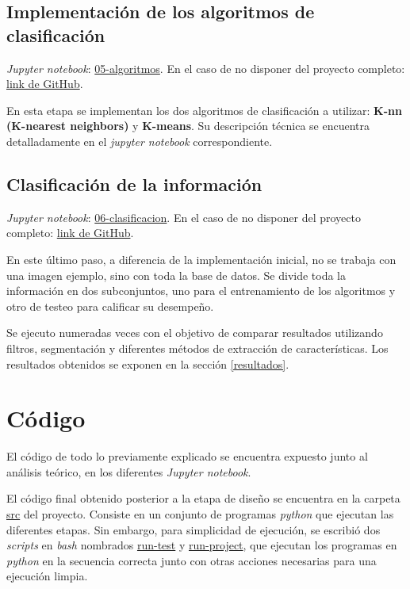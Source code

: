 \documentclass[10pt,a4paper]{article}
\begin{document}
\subsection{Implementación de los algoritmos de clasificación}
\textit{Jupyter notebook}: \href{./05-algoritmos.ipynb}{05-algoritmos}. En el caso de no disponer del proyecto completo: \href{https://github.com/FernandezGFG/fruit-classifier/blob/master/05-algoritmos.ipynb}{link de GitHub}.

En esta etapa se implementan los dos algoritmos de clasificación a utilizar: \textbf{K-nn (K-nearest neighbors)} y \textbf{K-means}. Su descripción técnica se encuentra detalladamente en el \textit{jupyter notebook} correspondiente.

\subsection{Clasificación de la información}
\textit{Jupyter notebook}: \href{./06-clasificacion.ipynb}{06-clasificacion}. En el caso de no disponer del proyecto completo: \href{https://github.com/FernandezGFG/fruit-classifier/blob/master/06-clasificacion.ipynb}{link de GitHub}.

En este último paso, a diferencia de la implementación inicial, no se trabaja con una imagen ejemplo, sino con toda la base de datos. Se divide toda la información en dos subconjuntos, uno para el entrenamiento de los algoritmos y otro de testeo para calificar su desempeño.

Se ejecuto numeradas veces con el objetivo de comparar resultados utilizando filtros, segmentación y diferentes métodos de extracción de características. Los resultados obtenidos se exponen en la sección \ref{resultados}.

\section{Código}
El código de todo lo previamente explicado se encuentra expuesto junto al análisis teórico, en los diferentes \textit{Jupyter notebook}.

El código final obtenido posterior a la etapa de diseño se encuentra en la carpeta \href{./src/}{src} del proyecto. Consiste en un conjunto de programas \textit{python} que ejecutan las diferentes etapas. Sin embargo, para simplicidad de ejecución, se escribió dos \textit{scripts} en \textit{bash} nombrados \href{./run-test}{run-test} y \href{./run-project}{run-project}, que ejecutan los programas en \textit{python} en la secuencia correcta junto con otras acciones necesarias para una ejecución limpia.
\end{document}
